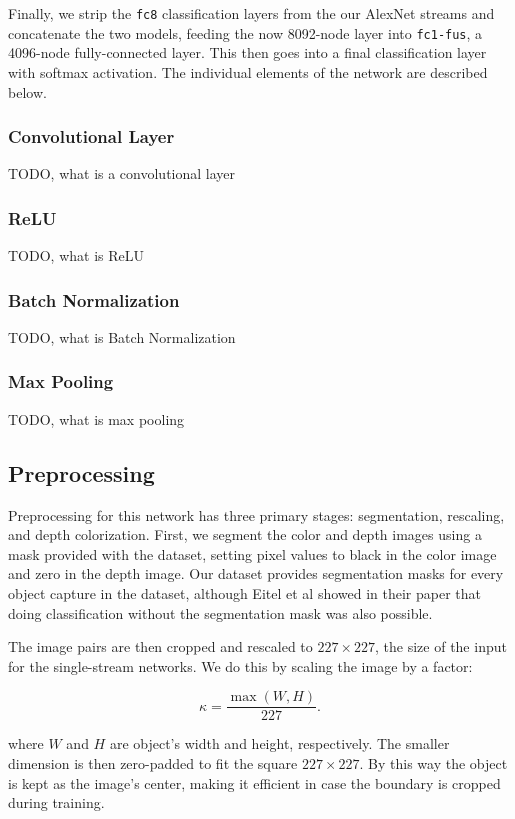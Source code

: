 Finally, we strip the \texttt{fc8} classification layers from the our AlexNet streams and concatenate the two models, feeding the now 8092-node layer into \texttt{fc1-fus}, a 4096-node fully-connected layer. This then goes into a final classification layer with softmax activation. The individual elements of the network are described below.

\subsubsection{Convolutional Layer}
TODO, what is a convolutional layer

\subsubsection{ReLU}
TODO, what is ReLU

\subsubsection{Batch Normalization}
TODO, what is Batch Normalization

\subsubsection{Max Pooling}
TODO, what is max pooling




\subsection{Preprocessing}

Preprocessing for this network has three primary stages: segmentation, rescaling, and depth colorization. First, we segment the color and depth images using a mask provided with the dataset, setting pixel values to black in the color image and zero in the depth image. Our dataset provides segmentation masks for every object capture in the dataset, although Eitel et al \cite{Eitel2015} showed in their paper that doing classification without the segmentation mask was also possible.

The image pairs are then cropped and rescaled to $227 \times 227$, the size of the input for the single-stream networks. We do this by scaling the image by a factor:

\[ \kappa = \frac{\max(W, H)}{227}. \]

where $W$ and $H$ are object's width and height, respectively. The smaller dimension is then zero-padded to fit the square $227 \times 227$. By this way the object is kept as the image's center, making it efficient in case the boundary is cropped during training. 

